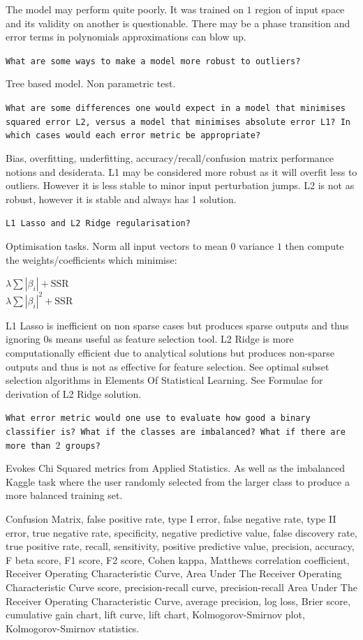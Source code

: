The model may perform quite poorly. It was trained on $1$ region of input space and its validity on another is questionable. There may be a phase transition and error terms in polynomials approximations can blow up.

\texttt{What are some ways to make a model more robust to outliers?}

Tree based model. Non parametric test.

\texttt{What are some differences one would expect in a model that minimises squared error L2, versus a model that minimises absolute error L1? In which cases would each error metric be appropriate?}

Bias, overfitting, underfitting, accuracy/recall/confusion matrix performance notions and desiderata. L1 may be considered more robust as it will overfit less to outliers. However it is less stable to minor input perturbation jumps. L2 is not as robust, however it is stable and always has 1 solution.

\texttt{L1 Lasso and L2 Ridge regularisation?}

Optimisation tasks. Norm all input vectors to mean $0$ variance $1$ then compute the weights/coefficients which minimise:

$\lambda \sum |\beta_i| + \text{SSR}$ \\
$\lambda \sum |\beta_i|^2 + \text{SSR}$

L1 Lasso is inefficient on non sparse cases but produces sparse outputs and thus ignoring 0s means useful as feature selection tool. L2 Ridge is more computationally efficient due to analytical solutions but produces non-sparse outputs and thus is not as effective for feature selection. See optimal subset selection algorithms in Elements Of Statistical Learning. See Formulae for derivation of L2 Ridge solution.

\texttt{What error metric would one use to evaluate how good a binary classifier is? What if the classes are imbalanced? What if there are more than $2$ groups?}

Evokes Chi Squared metrics from Applied Statistics. As well as the imbalanced Kaggle task where the user randomly selected from the larger class to produce a more balanced training set.

Confusion Matrix, false positive rate, type I error, false negative rate, type II error, true negative rate, specificity, negative predictive value, false discovery rate, true positive rate, recall, sensitivity, positive predictive value, precision, accuracy, F beta score, F1 score, F2 score, Cohen kappa, Matthews correlation coefficient, Receiver Operating Characteristic Curve, Area Under The Receiver Operating Characteristic Curve score, precision-recall curve, precision-recall Area Under The Receiver Operating Characteristic Curve, average precision, log loss, Brier score, cumulative gain chart, lift curve, lift chart, Kolmogorov-Smirnov plot, Kolmogorov-Smirnov statistics.

